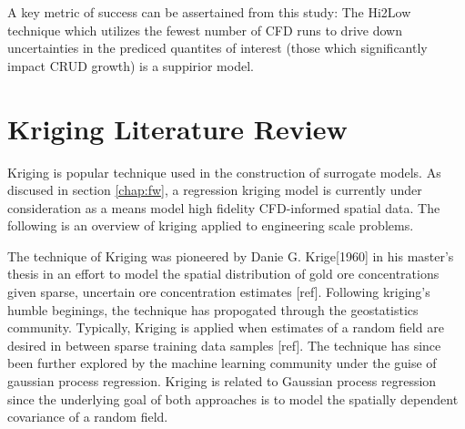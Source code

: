 A key metric of success can be assertained from this study:  The Hi2Low technique which utilizes the fewest number of CFD runs to drive down uncertainties in the prediced quantites of interest (those which significantly impact CRUD growth) is a suppirior model.


\section{Kriging Literature Review}

Kriging is popular technique used in the construction of surrogate models.  As discused in section \ref{chap:fw}, a regression kriging model is currently under consideration as a means model high fidelity CFD-informed spatial data. The following is an overview of kriging applied to engineering scale problems.

The technique of Kriging was pioneered by Danie G. Krige[1960] in his master's thesis in an effort to model the spatial distribution of gold ore concentrations given sparse, uncertain ore concentration estimates [ref]. Following kriging's humble beginings, the technique has propogated through the geostatistics community. Typically, Kriging is applied when estimates of a random field are desired in between sparse training data samples [ref].  The technique has since been further explored by the machine learning community under the guise of gaussian process regression.
Kriging is related to Gaussian process regression since the underlying goal of both approaches is to model the spatially dependent covariance of a random field.  
